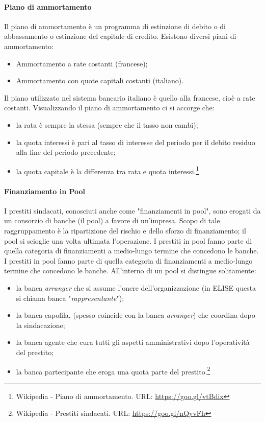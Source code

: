 \paragraph{Piano di ammortamento}
Il piano di ammortamento è un programma di estinzione di debito o di abbassamento o estinzione del capitale di credito. Esistono diversi piani di ammortamento:
	\begin{itemize}
		\item Ammortamento a rate costanti (francese);
		\item Ammortamento con quote capitali costanti (italiano).	
	\end{itemize}
Il piano utilizzato nel sistema bancario italiano è quello alla francese, cioè a rate costanti. Visualizzando il piano di ammortamento ci si accorge che:
	\begin{itemize}
		\item la rata è sempre la stessa (sempre che il tasso non cambi);
		\item la quota interessi è pari al tasso di interesse del periodo per il debito residuo alla fine del periodo precedente;
		\item la quota capitale è la differenza tra rata e quota interessi.\footnote{Wikipedia - Piano di ammortamento. URL: \url{https://goo.gl/vtBdix}}
	\end{itemize}

\paragraph{Finanziamento in Pool}
I prestiti sindacati, conosciuti anche come "finanziamenti in pool", sono erogati da un consorzio di banche (il pool) a favore di un'impresa. Scopo di tale raggruppamento è la ripartizione del rischio e dello sforzo di finanziamento; il pool si scioglie una volta ultimata l'operazione. I prestiti in pool fanno parte di quella categoria di finanziamenti a medio-lungo termine che concedono le banche. I prestiti in pool fanno parte di quella categoria di finanziamenti a medio-lungo termine che concedono le banche. All'interno di un pool si distingue solitamente:
	\begin{itemize}
		\item la banca \textit{arranger} che si assume l'onere dell'organizzazione (in ELISE questa si chiama banca "\textit{rappresentante}");
		\item la banca capofila, (spesso coincide con la banca \textit{arranger}) che coordina dopo la sindacazione;
		\item la banca agente che cura tutti gli aspetti amministrativi dopo l'operatività del prestito;
		\item la banca partecipante che eroga una quota parte del prestito.\footnote{Wikipedia - Prestiti sindacati. URL: \url{https://goo.gl/nQyvFh}}
	\end{itemize}

